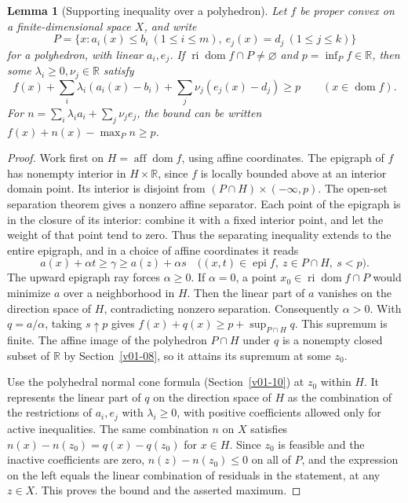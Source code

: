 \documentclass[11pt,oneside,openany]{book}
\newcommand{\R}{\mathbb R}
\theoremstyle{plain}
\newtheorem{lemma}[theorem]{Lemma}
\theoremstyle{definition}
\theoremstyle{remark}
\begin{document}
\begin{lemma}[Supporting inequality over a polyhedron]\label{lem:polyhedral-support}
Let \(f\) be proper convex on a finite-dimensional space
\(X\), and write
\[
 P=\{x:a_i(x)\le b_i\ (1\le i\le m),\
                 e_j(x)=d_j\ (1\le j\le k)\}
\]
for a polyhedron, with linear \(a_i,e_j\).
If \(\operatorname{ri}\operatorname{dom}f\cap P\ne\varnothing\)
and \(p=\inf_P f\in\R\), then some \(\lambda_i\ge0,\nu_j\in\R\)
satisfy
\[
 f(x)+\sum_i\lambda_i(a_i(x)-b_i)
       +\sum_j\nu_j(e_j(x)-d_j)\ge p
 \qquad(x\in\operatorname{dom}f).
\]
For \(n=\sum_i\lambda_i a_i+\sum_j\nu_j e_j\), the bound
can be written \(f(x)+n(x)-\max_P n\ge p\).
\end{lemma}

\begin{proof}
Work first on \(H=\operatorname{aff}\operatorname{dom}f\),
using affine coordinates. The epigraph of \(f\) has nonempty
interior in \(H\times\R\), since \(f\) is locally bounded
above at an interior domain point. Its interior is disjoint
from \((P\cap H)\times(-\infty,p)\).
The open-set separation theorem gives a nonzero affine
separator. Each point of the epigraph is in the closure
of its interior: combine it with a fixed interior point,
and let the weight of that point tend to zero. Thus the
separating inequality extends to the entire epigraph,
and in a choice of affine coordinates it reads
\[
 a(x)+\alpha t\ge\gamma\ge a(z)+\alpha s
 \quad\bigl((x,t)\in\operatorname{epi}f,\
        z\in P\cap H,\ s<p\bigr).
\]
The upward epigraph ray forces \(\alpha\ge0\).
If \(\alpha=0\), a point \(x_0\in
\operatorname{ri}\operatorname{dom}f\cap P\)
would minimize \(a\) over a neighborhood in \(H\).
Then the linear part of \(a\) vanishes on the direction
space of \(H\), contradicting nonzero separation.
Consequently \(\alpha>0\). With \(q=a/\alpha\), taking
\(s\uparrow p\) gives
\(f(x)+q(x)\ge p+\sup_{P\cap H}q\).
This supremum is finite. The affine image of the
polyhedron \(P\cap H\) under \(q\) is a nonempty closed
subset of \(\R\) by Section~\ref{v01-08}, so it attains
its supremum at some \(z_0\).

Use the polyhedral normal cone formula
(Section~\ref{v01-10}) at \(z_0\) within \(H\).
It represents the linear part of \(q\) on the direction
space of \(H\) as the combination of the restrictions of
\(a_i,e_j\) with \(\lambda_i\ge0\), with positive
coefficients allowed only for active inequalities.
The same combination \(n\) on \(X\) satisfies
\(n(x)-n(z_0)=q(x)-q(z_0)\) for \(x\in H\).
Since \(z_0\) is feasible and the inactive coefficients
are zero, \(n(z)-n(z_0)\le0\) on all of \(P\), and the
expression on the left equals the linear combination
of residuals in the statement, at any \(z\in X\).
This proves the bound and the asserted maximum.
\end{proof}
\end{document}
